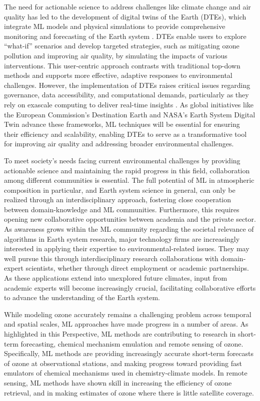 \documentclass[gmd, manuscript]{copernicus}
\begin{document}
The need for actionable science to address challenges like climate change and air quality has led to the development of digital twins of the Earth (DTEs), which integrate ML models and physical simulations to provide comprehensive monitoring and forecasting of the Earth system \citep{bauer_digital_2021, Bauer2024}. DTEs enable users to explore “what-if” scenarios and develop targeted strategies, such as mitigating ozone pollution and improving air quality, by simulating the impacts of various interventions. This user-centric approach contrasts with traditional top-down methods and supports more effective, adaptive responses to environmental challenges. However, the implementation of DTEs raises critical issues regarding governance, data accessibility, and computational demands, particularly as they rely on exascale computing to deliver real-time insights \citep{Hazeleger2024}. As global initiatives like the European Commission’s Destination Earth and NASA’s Earth System Digital Twin advance these frameworks, ML techniques will be essential for ensuring their efficiency and scalability, enabling DTEs to serve as a transformative tool for improving air quality and addressing broader environmental challenges.

To meet society's needs facing current environmental challenges by providing actionable science and maintaining the rapid progress in this field, collaboration among different communities is essential. The full potential of ML in atmospheric composition in particular, and Earth system science in general, can only be realized through an interdisciplinary approach, fostering close cooperation between domain-knowledge and ML communities. Furthermore, this requires opening new collaborative opportunities between academia and the private sector. As awareness grows within the ML community regarding the societal relevance of algorithms in Earth system research, major technology firms are increasingly interested in applying their expertise to environmental-related issues. They may well pursue this through interdisciplinary research collaborations with domain-expert scientists, whether through direct employment or academic partnerships. As these applications extend into unexplored future climates, input from academic experts will become increasingly crucial, facilitating collaborative efforts to advance the understanding of the Earth system.


\conclusions  %
While modeling ozone accurately remains a challenging problem across temporal and spatial scales, ML approaches have made progress in a number of areas. As highlighted in this Perspective, ML methods are contributing to research in short-term forecasting, chemical mechanism emulation and remote sensing of ozone. Specifically, ML methods are providing increasingly accurate short-term forecasts of ozone at observational stations, and making progress toward providing fast emulators of chemical mechanisms used in chemistry-climate models. In remote sensing, ML methods have shown skill in increasing the efficiency of ozone retrieval, and in making estimates of ozone where there is little satellite coverage. 
\end{document}
